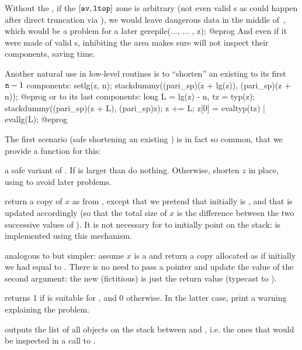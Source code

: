 Without the , if the $[{\tt av}, {\tt ltop}]$ zone is
arbitrary (not even valid s as could happen after direct
truncation via ), we would leave dangerous data in the middle
of~, which would be a problem for a later
\bprog
  gerepile(..., ... , z);
@eprog\noindent
And even if it were made of valid s, inhibiting the area makes sure
 will not inspect their components, saving time.

Another natural use in low-level routines is to ``shorten'' an existing
  to its first ${\tt n}-1$ components:
\bprog
  setlg(z, n);
  stackdummy((pari_sp)(z + lg(z)), (pari_sp)(z + n));
@eprog\noindent
or to its last  components:
\bprog
  long L = lg(z) - n, tz = typ(z);
  stackdummy((pari_sp)(z + L), (pari_sp)z);
  z += L; z[0] = evaltyp(tz) | evallg(L);
@eprog

The first scenario (safe shortening an existing ) is in fact so
common, that we provide a function for this:

 a safe variant of . If
 is larger than  do nothing. Otherwise, shorten $z$ in
place, using  to avoid later  problems.

 return a copy of $x$ as from
, except that we pretend that initially  is ,
and that  is updated accordingly (so that the total size of $x$ is
the difference between the two successive values of ). It is not
necessary for  to initially point on the stack:  is
implemented using this mechanism.

 analogous to  but
simpler: assume $x$ is a  and return a copy allocated as if
initially we had  equal to . There is no need to pass a
pointer and update the value of the second argument: the new (fictitious)
 is just the return value (typecast to ).


 returns 1 if  is suitable for
, and 0 otherwise. In the latter case, print a warning
explaining the problem.

 outputs the list of all objects on the
stack between  and , i.e. the ones that would be inspected
in a call to .


